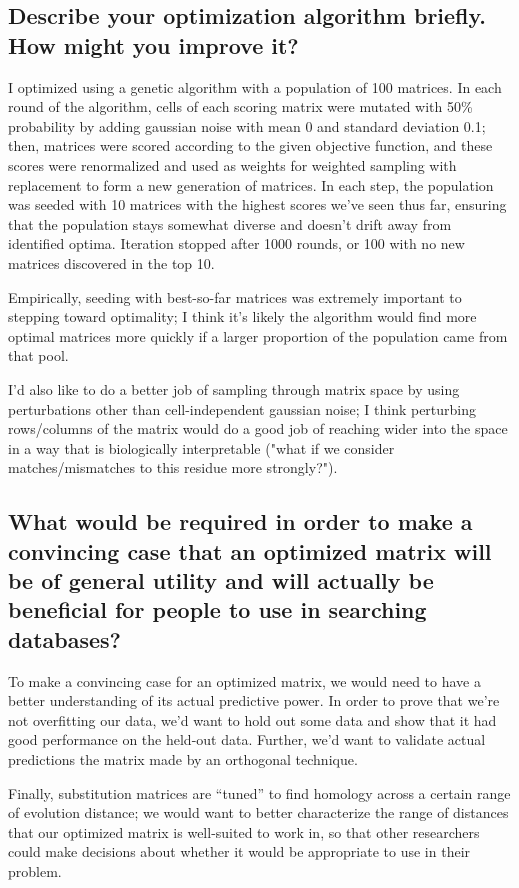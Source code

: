 \documentclass[]{article}
\begin{document}
\subsection{Describe your optimization algorithm briefly. How might you improve it?}

I optimized using a genetic algorithm with a population of 100 matrices. In each round of the algorithm, cells of each scoring matrix were mutated with 50\% probability by adding gaussian noise with mean 0 and standard deviation 0.1; then, matrices were scored according to the given objective function, and these scores were renormalized and used as weights for weighted sampling with replacement to form a new generation of matrices. In each step, the population was seeded with 10 matrices with the highest scores we've seen thus far, ensuring that the population stays somewhat diverse and doesn't drift away from identified optima. Iteration stopped after 1000 rounds, or 100 with no new matrices discovered in the top 10.

Empirically, seeding with best-so-far matrices was extremely important to stepping toward optimality; I think it's likely the algorithm would find more optimal matrices more quickly if a larger proportion of the population came from that pool.

I'd also like to do a better job of sampling through matrix space by using perturbations other than cell-independent gaussian noise; I think perturbing rows/columns of the matrix would do a good job of reaching wider into the space in a way that is biologically interpretable ("what if we consider matches/mismatches to this residue more strongly?").

\subsection{What would be required in order to make a convincing case that an optimized matrix will be of general utility and will actually be beneficial for people to use in searching databases?}

To make a convincing case for an optimized matrix, we would need to have a better understanding of its actual predictive power. In order to prove that we're not overfitting our data, we'd want to hold out some data and show that it had good performance on the held-out data. Further, we'd want to validate actual predictions the matrix made by an orthogonal technique.

Finally, substitution matrices are ``tuned'' to find homology across a certain range of evolution distance; we would want to better characterize the range of distances that our optimized matrix is well-suited to work in, so that other researchers could make decisions about whether it would be appropriate to use in their problem.
\end{document}
